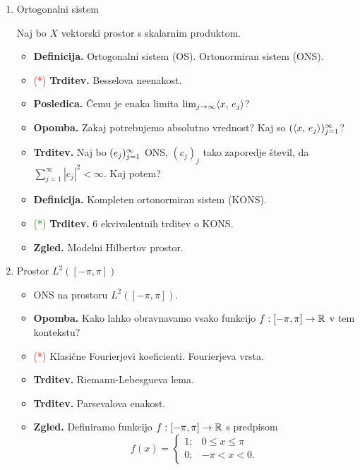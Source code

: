 \begin{enumerate}
    \item Ortogonalni sistem
    
    Naj bo \(X\) vektorski prostor s skalarnim produktom.
    \begin{itemize}
        \item \textbf{Definicija.} Ortogonalni sistem (OS). Ortonormiran sistem (ONS).
        \item \textcolor{red}{(*)} \textbf{Trditev.} Besselova neenakost.
        \item \textbf{Posledica.} Čemu je enaka limita \(\lim_{j \to \infty} \langle x, \, e_j \rangle\)?
        \item \textbf{Opomba.} Zakaj potrebujemo absolutno vrednost? Kaj so \((\langle x, \, e_j \rangle)_{j=1}^\infty\)?
        \item \textbf{Trditev.} Naj bo \((e_j)_{j=1}^\infty\) ONS, \((c_j)_j\) tako zaporedje števil, da \(\sum_{j=1}^{\infty} |c_j|^2 < \infty\). Kaj potem?
        \item \textbf{Definicija.} Kompleten ortonormiran sistem (KONS).
        \item \textcolor{green}{(*)} \textbf{Trditev.} 6 ekvivalentnih trditev o KONS.
        \item \textbf{Zgled.} Modelni Hilbertov prostor.  
    \end{itemize}

    \item Prostor \(L^2([-\pi, \pi])\)
    \begin{itemize}
        \item ONS na prostoru \(L^2([-\pi, \pi])\). 
        \item \textbf{Opomba.} Kako lahko obravnavamo vsako funkcijo \(f: [-\pi, \pi] \to \mathbb{R}\) v tem kontekstu?
        \item \textcolor{red}{(*)} Klasične Fourierjevi koeficienti. Fourierjeva vrsta.
        \item \textbf{Trditev.} Riemann-Lebesgueva lema.
        \item \textbf{Trditev.} Parsevalova enakost.
        \item \textbf{Zgled.} Definiramo funkcijo \(f: [-\pi, \pi] \to \mathbb{R}\) s predpisom
        \[
            f(x) = \begin{cases}
                1; &0 \leq x \leq \pi \\
                0; &-\pi < x < 0.
            \end{cases}
        \]
        

\end{itemize}
\end{enumerate}
